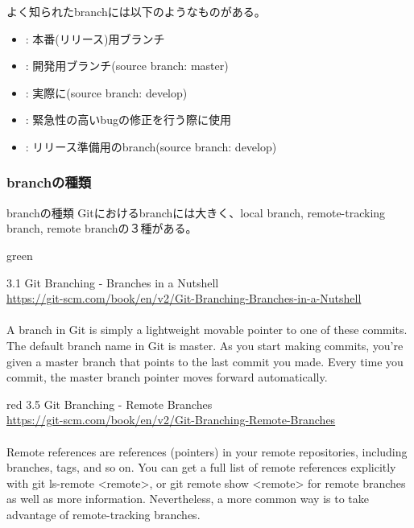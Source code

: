 \documentclass[10pt,a4j,openany,dvipdfmx]{jsarticle}
\begin{document}
よく知られたbranchには以下のようなものがある。
\begin{tcolorbox}[colframe=Cyan]
    \begin{itemize}
        \item {}: 本番(リリース)用ブランチ
        \item {}: 開発用ブランチ(source branch: master)
        \item {}: 実際に(source branch: develop)
        \item {}: 緊急性の高いbugの修正を行う際に使用
        \item {}: リリース準備用のbranch(source branch: develop)
    \end{itemize}
\end{tcolorbox}

\subsubsection{branchの種類} %
\label{ssub:branchの種類}

\begin{oceanbox}{branchの種類}
Gitにおけるbranchには大きく、local branch, remote-tracking branch, remote branchの３種がある。
\end{oceanbox}


\begin{ColorReferenceBox}{green}

3.1 Git Branching - Branches in a Nutshell\\
\url{https://git-scm.com/book/en/v2/Git-Branching-Branches-in-a-Nutshell}\\
\\
A branch in Git is simply a lightweight movable pointer to one of these commits. The default branch name in Git is master. As you start making commits, you’re given a master branch that points to the last commit you made. Every time you commit, the master branch pointer moves forward automatically.

\end{ColorReferenceBox}


\begin{ColorReferenceBox}{red}
3.5 Git Branching - Remote Branches\\
\url{https://git-scm.com/book/en/v2/Git-Branching-Remote-Branches}\\
\\
Remote references are references (pointers) in your remote repositories, including branches, tags, and so on. You can get a full list of remote references explicitly with git ls-remote <remote>, or git remote show <remote> for remote branches as well as more information. Nevertheless, a more common way is to take advantage of remote-tracking branches.

\end{ColorReferenceBox}
\end{document}
